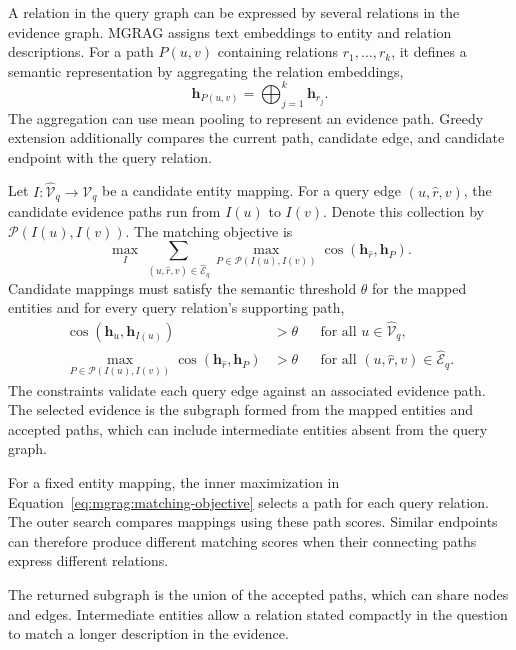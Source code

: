 A relation in the query graph can be expressed by several relations in the evidence graph. MGRAG assigns text embeddings to entity and relation descriptions. For a path $P(u,v)$ containing relations $r_1,\ldots,r_k$, it defines a semantic representation by aggregating the relation embeddings,
\begin{equation}
 \mathbf h_{P(u,v)}=\bigoplus_{j=1}^{k}\mathbf h_{r_j}.
\label{eq:mgrag:path-embedding}
\end{equation}
The aggregation can use mean pooling to represent an evidence path. Greedy extension additionally compares the current path, candidate edge, and candidate endpoint with the query relation.

Let $I:\widehat{\mathcal V}_q\rightarrow\mathcal V_q$ be a candidate entity mapping. For a query edge $(u,\widehat r,v)$, the candidate evidence paths run from $I(u)$ to $I(v)$. Denote this collection by $\mathcal P(I(u),I(v))$. The matching objective is
\begin{equation}
\max_I\ \sum_{(u,\widehat r,v)\in\widehat{\mathcal E}_q}
 \max_{P\in\mathcal P(I(u),I(v))}
 \cos(\mathbf h_{\widehat r},\mathbf h_P).
\label{eq:mgrag:matching-objective}
\end{equation}
Candidate mappings must satisfy the semantic threshold $\theta$ for the mapped entities and for every query relation's supporting path,
\begin{align}
 \cos(\mathbf h_u,\mathbf h_{I(u)})&>\theta
 &&\text{for all }u\in\widehat{\mathcal V}_q,\\
 \max_{P\in\mathcal P(I(u),I(v))}\cos(\mathbf h_{\widehat r},\mathbf h_P)&>\theta
 &&\text{for all }(u,\widehat r,v)\in\widehat{\mathcal E}_q.
\label{eq:mgrag:matching-constraints}
\end{align}
The constraints validate each query edge against an associated evidence path. The selected evidence is the subgraph formed from the mapped entities and accepted paths, which can include intermediate entities absent from the query graph.

For a fixed entity mapping, the inner maximization in Equation~\ref{eq:mgrag:matching-objective} selects a path for each query relation. The outer search compares mappings using these path scores. Similar endpoints can therefore produce different matching scores when their connecting paths express different relations.

The returned subgraph is the union of the accepted paths, which can share nodes and edges. Intermediate entities allow a relation stated compactly in the question to match a longer description in the evidence.

